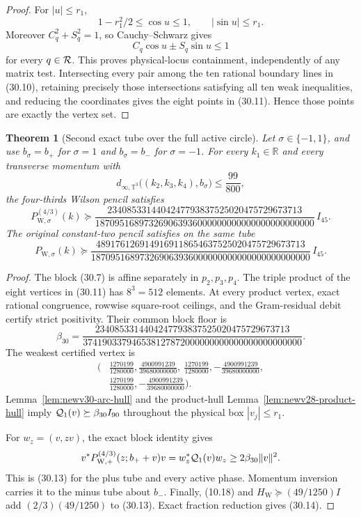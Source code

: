 \documentclass[11pt,oneside]{article}
\newtheorem{theorem}{Theorem}[section]
\theoremstyle{definition}
\theoremstyle{remark}
\begin{document}
\begin{proof}
For \(|u|\le r_1\),
\[
 1-r_1^2/2\le\cos u\le1,\qquad |\sin u|\le r_1.
\]
Moreover \(C_q^2+S_q^2=1\), so Cauchy--Schwarz gives
\[
 C_q\cos u\pm S_q\sin u\le1
\]
for every \(q\in{\cal R}\).  This proves physical-locus
containment, independently of any matrix test.  Intersecting every
pair among the ten rational boundary lines in (30.10), retaining
precisely those intersections satisfying all ten weak
inequalities, and reducing the coordinates gives the eight points
in (30.11).  Hence those points are exactly the vertex set.
\end{proof}

\begin{theorem}[Second exact tube over the full active circle]
\label{thm:newv30-second-tube}
Let \(\sigma\in\{-1,1\}\), and use \(b_\sigma=b_+\) for
\(\sigma=1\) and \(b_\sigma=b_-\) for \(\sigma=-1\).
For every \(k_1\in\mathbb R\) and every transverse momentum with
\[
 d_{\infty,\mathbb T^3}
 \bigl((k_2,k_3,k_4),b_\sigma\bigr)\le\frac{99}{800},   \tag{30.12}
\]
the four-thirds Wilson pencil satisfies
\[
 P_{\mathrm W,\sigma}^{(4/3)}(k)\succeq
 \frac{2340853314404247793837525020475729673713}
 {187095168973269063936000000000000000000000000}\,
 I_{45}.                                                \tag{30.13}
\]
The original constant-two pencil satisfies on the same tube
\[
 P_{\mathrm W,\sigma}(k)\succeq
 \frac{4891761269149169118654637525020475729673713}
 {187095168973269063936000000000000000000000000}\,
 I_{45}.                                                \tag{30.14}
\]
\end{theorem}

\begin{proof}
The block (30.7) is affine separately in \(p_2,p_3,p_4\).
The triple product of the eight vertices in (30.11) has
\(8^3=512\) elements.  At every product vertex, exact rational
congruence, rowwise square-root ceilings, and the Gram-residual
debit certify strict positivity.  Their common block floor is
\[
 \beta_{30}=
 \frac{2340853314404247793837525020475729673713}
 {374190337946538127872000000000000000000000000}.       \tag{30.15}
\]
The weakest certified vertex is
\[
\begin{split}
\biggl(&\frac{1270199}{1280000},
        \frac{4900991239}{39680000000},\
        \frac{1270199}{1280000},
       -\frac{4900991239}{39680000000},\\
      &\frac{1270199}{1280000},
       -\frac{4900991239}{39680000000}\biggr).
\end{split}                                             \tag{30.16}
\]
Lemma~\ref{lem:newv30-arc-hull} and the product-hull
Lemma~\ref{lem:newv28-product-hull} imply
\({\cal Q}_1(v)\succeq\beta_{30}I_{90}\) throughout the
physical box \(|v_j|\le r_1\).

For \(w_z=(v,zv)\), the exact block identity gives
\[
 v^*P_{\mathrm W,+}^{(4/3)}(z;b_++v)v
 =w_z^*{\cal Q}_1(v)w_z
 \ge2\beta_{30}\|v\|^2.
\]
This is (30.13) for the plus tube and every active phase.
Momentum inversion carries it to the minus tube about \(b_-\).
Finally, (10.18) and
\(H_{\mathrm W}\succeq(49/1250)I\) add
\((2/3)(49/1250)\) to (30.13).  Exact fraction reduction gives
(30.14).
\end{proof}
\end{document}
